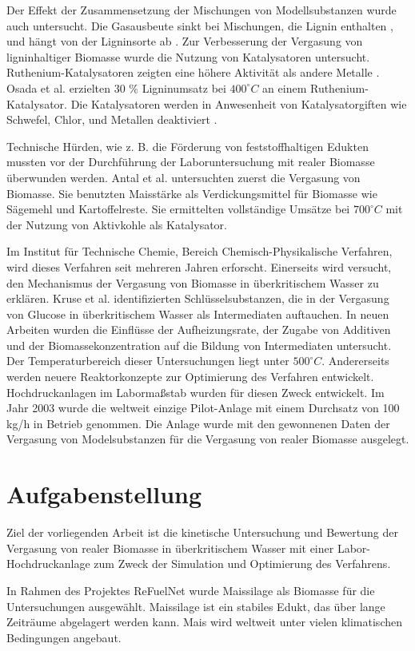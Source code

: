 Der Effekt der Zusammensetzung der Mischungen von Modellsubstanzen wurde auch untersucht. Die Gasausbeute sinkt bei Mischungen, die Lignin enthalten \cite{idea01}, und hängt von der Ligninsorte ab \cite{yoshida04}. Zur Verbesserung der Vergasung von ligninhaltiger Biomasse wurde die Nutzung von Katalysatoren untersucht. Ruthenium-Katalysatoren zeigten eine höhere Aktivität als andere Metalle \cite{sato03}. Osada et al. \cite{osa04} erzielten 30 \% Ligninumsatz bei $400 ^{\circ}C$ an einem Ruthenium-Katalysator. Die Katalysatoren werden in Anwesenheit von Katalysatorgiften wie Schwefel, Chlor, und Metallen deaktiviert \cite{matsu05}. 

Technische Hürden, wie z. B. die Förderung von feststoffhaltigen Edukten mussten vor der Durchführung der Laboruntersuchung mit realer Biomasse überwunden werden. Antal et al. untersuchten zuerst die Vergasung von Biomasse. Sie benutzten Maisstärke als Verdickungsmittel für Biomasse wie Sägemehl und Kartoffelreste. Sie ermittelten vollständige Umsätze bei $700 ^{\circ}C$ mit der Nutzung von Aktivkohle als Katalysator.
 
Im Institut für Technische Chemie, Bereich Chemisch-Physikalische Verfahren, wird dieses Verfahren seit mehreren Jahren erforscht.  Einerseits wird  versucht, den Mechanismus der Vergasung von Biomasse in überkritischem Wasser zu erklären.  Kruse et al.  identifizierten Schlüsselsubstanzen, die in der Vergasung von Glucose in überkritischem Wasser als Intermediaten auftauchen. In neuen Arbeiten wurden die Einflüsse der Aufheizungsrate, der Zugabe von Additiven und der Biomassekonzentration auf die Bildung von Intermediaten untersucht. Der Temperaturbereich dieser Untersuchungen liegt unter $500 ^{\circ}C$. Andererseits werden neuere Reaktorkonzepte zur Optimierung des Verfahren entwickelt. Hochdruckanlagen im Labormaßstab wurden für diesen Zweck entwickelt. Im Jahr 2003 wurde die weltweit einzige Pilot-Anlage mit einem Durchsatz von 100 kg/h in Betrieb genommen. Die Anlage wurde mit den gewonnenen Daten der Vergasung von Modelsubstanzen für die Vergasung von realer Biomasse ausgelegt. 
\section{Aufgabenstellung}
Ziel der vorliegenden Arbeit ist die kinetische Untersuchung und Bewertung der Vergasung von realer Biomasse in überkritischem Wasser mit einer Labor-Hochdruckanlage zum Zweck der Simulation und Optimierung des Verfahrens.

In Rahmen des Projektes ReFuelNet wurde Maissilage als Biomasse für die Untersuchungen ausgewählt.  Maissilage ist ein stabiles Edukt, das über lange Zeiträume abgelagert werden kann. Mais wird weltweit unter vielen klimatischen Bedingungen angebaut.

